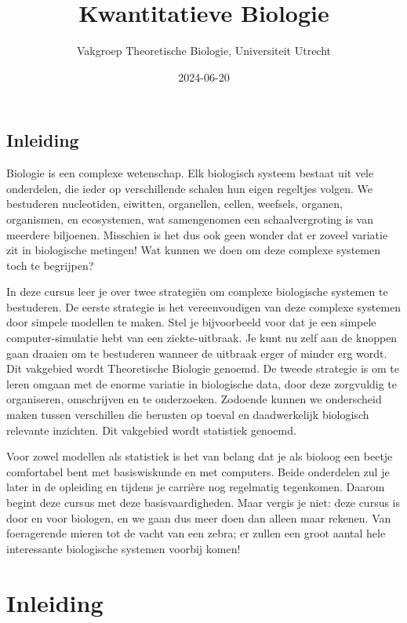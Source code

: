 \documentclass[
  a4paper,
]{scrbook}
\title{Kwantitatieve Biologie}
\author{Vakgroep Theoretische Biologie, Universiteit Utrecht}
\date{2024-06-20}
\renewcommand*\contentsname{Inhoudsopgave}
\newcommand\contentsname{Inhoudsopgave}
\theoremstyle{definition}
\theoremstyle{remark}
\begin{document}
\frontmatter
\maketitle

\renewcommand*\contentsname{Inhoudsopgave}
{
\setcounter{tocdepth}{1}
\tableofcontents
}

\mainmatter
\chapter{Inleiding}\label{inleiding}

Biologie is een complexe wetenschap. Elk biologisch systeem bestaat uit
vele onderdelen, die ieder op verschillende schalen hun eigen regeltjes
volgen. We bestuderen nucleotiden, eiwitten, organellen, cellen,
weefsels, organen, organismen, en ecosystemen, wat samengenomen een
schaalvergroting is van meerdere biljoenen. Misschien is het dus ook
geen wonder dat er zoveel variatie zit in biologische metingen! Wat
kunnen we doen om deze complexe systemen toch te begrijpen?

In deze cursus leer je over twee strategiën om complexe biologische
systemen te bestuderen. De eerste strategie is het vereenvoudigen van
deze complexe systemen door simpele modellen te maken. Stel je
bijvoorbeeld voor dat je een simpele computer-simulatie hebt van een
ziekte-uitbraak. Je kunt nu zelf aan de knoppen gaan draaien om te
bestuderen wanneer de uitbraak erger of minder erg wordt. Dit vakgebied
wordt Theoretische Biologie genoemd. De tweede strategie is om te leren
omgaan met de enorme variatie in biologische data, door deze zorgvuldig
te organiseren, omschrijven en te onderzoeken. Zodoende kunnen we
onderscheid maken tussen verschillen die berusten op toeval en
daadwerkelijk biologisch relevante inzichten. Dit vakgebied wordt
statistiek genoemd.

Voor zowel modellen als statistiek is het van belang dat je als bioloog
een beetje comfortabel bent met basiswiskunde en met computers. Beide
onderdelen zul je later in de opleiding en tijdens je carrière nog
regelmatig tegenkomen. Daarom begint deze cursus met deze
basisvaardigheden. Maar vergis je niet: deze cursus is door en voor
biologen, en we gaan dus meer doen dan alleen maar rekenen. Van
foeragerende mieren tot de vacht van een zebra; er zullen een groot
aantal hele interessante biologische systemen voorbij komen!

\part{Inleiding}
\end{document}

